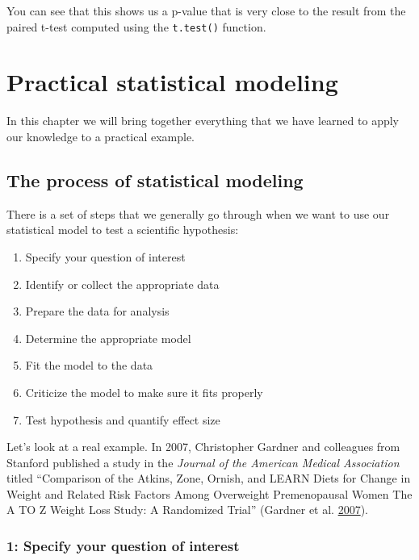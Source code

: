 \documentclass[12pt,]{book}
\providecommand{\tightlist}{%
  \setlength{\itemsep}{0pt}\setlength{\parskip}{0pt}}
\theoremstyle{definition}
\theoremstyle{definition}
\theoremstyle{definition}
\theoremstyle{remark}
\begin{document}
You can see that this shows us a p-value that is very close to the result from the paired t-test computed using the \texttt{t.test()} function.

\hypertarget{practical-example}{%
\chapter{Practical statistical modeling}\label{practical-example}}

In this chapter we will bring together everything that we have learned to apply our knowledge to a practical example.

\hypertarget{the-process-of-statistical-modeling}{%
\section{The process of statistical modeling}\label{the-process-of-statistical-modeling}}

There is a set of steps that we generally go through when we want to use our statistical model to test a scientific hypothesis:

\begin{enumerate}
\def\labelenumi{\arabic{enumi}.}
\tightlist
\item
  Specify your question of interest
\item
  Identify or collect the appropriate data
\item
  Prepare the data for analysis
\item
  Determine the appropriate model
\item
  Fit the model to the data
\item
  Criticize the model to make sure it fits properly
\item
  Test hypothesis and quantify effect size
\end{enumerate}

Let's look at a real example. In 2007, Christopher Gardner and colleagues from Stanford published a study in the \emph{Journal of the American Medical Association} titled ``Comparison of the Atkins, Zone, Ornish, and LEARN Diets for Change in Weight and Related Risk Factors Among Overweight Premenopausal Women
The A TO Z Weight Loss Study: A Randomized Trial'' (Gardner et al. \protect\hyperlink{ref-gard:kiaz:alha:2007}{2007}).

\hypertarget{specify-your-question-of-interest}{%
\subsection{1: Specify your question of interest}\label{specify-your-question-of-interest}}
\end{document}
